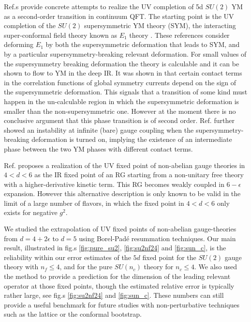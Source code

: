 \documentclass [11pt]{article}
\makeatletter
\def\section{\@startsection {section}{1}{\z@}{-3.5ex plus -1ex minus
 -.2ex}{2.3ex plus .2ex}{\large\bf}}
\makeatother
\begin{document}
Ref.s \cite{BenettiGenolini:2019zth, Bertolini:2021cew} provide concrete attempts to realize the UV completion of 5d $SU(2)$ YM as a second-order transition in continuum QFT.  The starting point is the UV completion of the $SU(2)$ supersymmetric YM theory (SYM), the interacting super-conformal field theory known as $E_1$ theory \cite{Seiberg:1996bd}. These references consider deforming $E_1$ by both the supersymmetric deformation that leads to SYM, and by a particular supersymmetry-breaking relevant deformation. For small values of the supersymmetry breaking deformation the theory is calculable and it can be shown to flow to YM in the deep IR. It was shown in \cite{BenettiGenolini:2019zth} that certain contact terms in the correlation functions of global symmetry currents depend on the sign of the supersymmetric deformation. This signals that a transition of some kind must happen in the un-calculable region in which the supersymmetric deformation is smaller than the non-supersymmetric one. However at the moment there is no conclusive argument that this phase transition is of second order. Ref. \cite{Bertolini:2021cew} further showed an instability at infinite (bare) gauge coupling when the supersymmetry-breaking deformation is turned on, implying the existence of an intermediate phase between the two YM phases with different contact terms.

Ref. \cite{Gracey:2015xmw} proposes a realization of the UV fixed point of non-abelian gauge theories in $4<d<6$ as the IR fixed point of an RG starting from a non-unitary free theory with a higher-derivative kinetic term. This RG becomes weakly coupled in $6-\epsilon$ expansion. However this alternative description is only known to be valid in the limit of a large number of flavors, in which the fixed point in $4<d<6$ only exists for negative $g^2$.


\section{Conclusions} 
\label{sec:conclu}

We studied the extrapolation of UV fixed points of non-abelian gauge-theories from $d=4+2\epsilon$ to $d=5$ using Borel-Pad\'e resummation techniques. Our main result, illustrated in fig.s \ref{fig:pure_su2}, \ref{fig:su2nf24} and \ref{fig:sun_c}, is the reliability within our error estimates of the $5d$ fixed point for the $SU(2)$ gauge theory with $n_f \leq 4$, and for the pure $SU(n_c)$ theory for $n_c \leq 4$. We also used the method to provide a prediction for the dimension of the leading relevant operator at those fixed points, though the estimated relative error is typically rather large, see fig.s \ref{fig:su2nf24} and \ref{fig:sun_c}. These numbers can still provide a useful benchmark for future studies with non-perturbative techniques such as the lattice or the conformal bootstrap.
\end{document}
